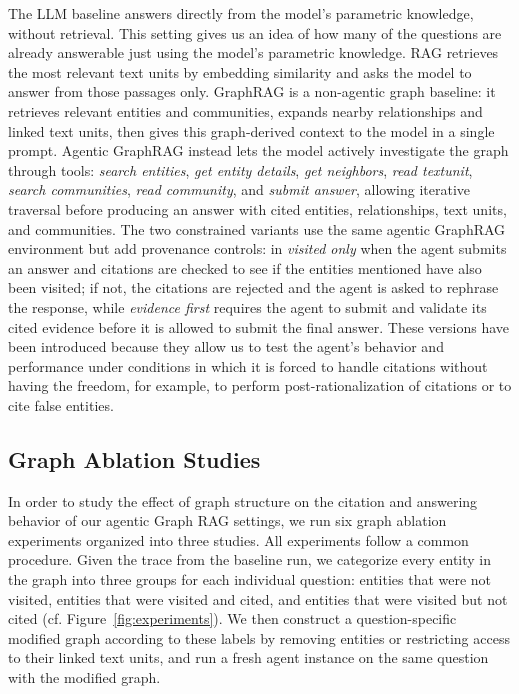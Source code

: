 \documentclass[
]{ceurart}
\begin{document}
The LLM baseline answers directly from the model’s parametric knowledge, without retrieval. This setting gives us an idea of how many of the questions are already answerable just using the model's parametric knowledge. RAG retrieves the most relevant text units by embedding similarity and asks the model to answer from those passages only. GraphRAG is a non-agentic graph baseline: it retrieves relevant entities and communities, expands nearby relationships and linked text units, then gives this graph-derived context to the model in a single prompt. Agentic GraphRAG instead lets the model actively investigate the graph through tools: \textit{search entities}, \textit{get entity details}, \textit{get neighbors}, \textit{read textunit}, \textit{search communities}, \textit{read community}, and \textit{submit answer}, allowing iterative traversal before producing an answer with cited entities, relationships, text units, and communities. The two constrained variants use the same agentic GraphRAG environment but add provenance controls: in \textit{visited only} when the agent submits an answer and citations are checked to see if the entities mentioned have also been visited; if not, the citations are rejected and the agent is asked to rephrase the response, while \textit{evidence first} requires the agent to submit and validate its cited evidence before it is allowed to submit the final answer. These versions have been introduced because they allow us to test the agent’s behavior and performance under conditions in which it is forced to handle citations without having the freedom, for example, to perform post-rationalization of citations or to cite false entities.

\subsection{Graph Ablation Studies}

In order to study the effect of graph structure on the citation and answering behavior of our agentic Graph RAG settings, we run six graph ablation experiments organized into three studies. All experiments follow a common procedure. Given the trace from the baseline run, we categorize every entity in the graph into three groups for each individual question: entities that were not visited, entities that were visited and cited, and entities that were visited but not cited (cf. Figure~\ref{fig:experiments}). We then construct a question-specific modified graph according to these labels by removing entities or restricting access to their linked text units, and run a fresh agent instance on the same question with the modified graph.
\end{document}
